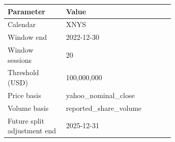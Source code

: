 \begin{tabular}{@{}lp{0.65\linewidth}@{}}
\toprule
Parameter & Value \\
\midrule
Calendar & XNYS \\
Window end & 2022-12-30 \\
Window sessions & 20 \\
Threshold (USD) & 100,000,000 \\
Price basis & yahoo\_\allowbreak{}nominal\_\allowbreak{}close \\
Volume basis & reported\_\allowbreak{}share\_\allowbreak{}volume \\
Future split adjustment end & 2025-12-31 \\
\bottomrule
\end{tabular}
